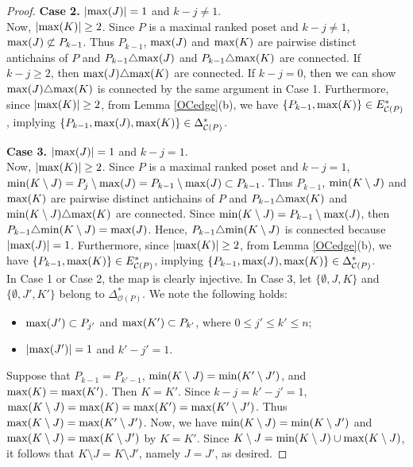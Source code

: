 \documentclass[12pt]{amsart}
\theoremstyle{definition}
\begin{document}
\begin{proof}
\medskip
\noindent
{\bf Case 2.} $|{\rm max}(J)| = 1$ and $k-j \neq 1$.\\
\indent
Now, $|{\rm max}(K)| \geq 2$.
Since $P$ is a maximal ranked poset and $k - j \neq 1$, ${\rm max}(J) \not\subset P_{k-1}$.
Thus $P_{k-1}$, ${\rm max}(J)$ and ${\rm max}(K)$ are pairwise distinct antichains of $P$ and $P_{k-1} \triangle {\rm max}(J)$ and $P_{k-1} \triangle {\rm max}(K)$ are connected.
If $k-j \geq 2$, then ${\rm max}(J) \triangle {\rm max}(K)$ are connected.
If $k-j = 0$, then we can show ${\rm max}(J) \triangle {\rm max}(K)$ is connected by the same argument in Case 1.
Furthermore, since $|{\rm max}(K)| \geq 2$, from Lemma \ref{OCedge}(b), we have $\{P_{k-1}, {\rm max}(K)\} \in E^{*}_{\mathcal{C}(P)}$, implying $\{P_{k-1},{\rm max}(J),{\rm max}(K)\} \in \Delta^{*}_{\mathcal{C}(P)}$. 


\medskip
\noindent
{\bf Case 3.} $|{\rm max}(J)| = 1$ and $k-j = 1$.\\
\indent
Now, $|{\rm max}(K)| \geq 2$.
Since $P$ is a maximal ranked poset and $k - j = 1$, ${\rm min}(K \setminus J) = P_j \setminus {\rm max}(J) = P_{k-1} \setminus {\rm max}(J) \subset P_{k-1}$.
Thus $P_{k-1}$, ${\rm min}(K \setminus J)$ and ${\rm max}(K)$ are pairwise distinct antichains of $P$ and $P_{k-1} \triangle {\rm max}(K)$ and ${\rm min}(K \setminus J)\triangle {\rm max}(K)$ are connected.
Since ${\rm min}(K \setminus J) = P_{k-1} \setminus {\rm max}(J)$, then $P_{k-1} \triangle {\rm min}(K \setminus J) = {\rm max}(J)$.
Hence, $P_{k-1} \triangle {\rm min}(K \setminus J)$ is connected because $|{\rm max}(J)|=1$.
Furthermore, since $|{\rm max}(K)| \geq 2$, from Lemma \ref{OCedge}(b), we have $\{P_{k-1}, {\rm max}(K)\} \in E^{*}_{\mathcal{C}(P)}$, implying $\{P_{k-1},{\rm max}(J),{\rm max}(K)\} \in \Delta^{*}_{\mathcal{C}(P)}$. 
\\

\medskip
In Case 1 or Case 2, the map is clearly injective.
In Case 3, let $\{\emptyset, J, K \}$ and $\{\emptyset, J', K' \}$ belong to $\Delta^{*}_{\mathcal{O}(P)}$.
We note the following holds:
\begin{itemize}
\item 
${\rm max}(J') \subset P_{j'}$ and ${\rm max}(K') \subset P_{k'}$, where $0 \leq j' \leq k' \leq n$;
\item
$|{\rm max}(J')|=1$ and $k'-j'=1$.
\end{itemize}
Suppose that $P_{k-1} = P_{k'-1}$, ${\rm min}(K \setminus J)={\rm min}(K' \setminus J')$, and ${\rm max}(K)={\rm max}(K')$.
Then $K=K'$.
Since $k - j = k' - j' = 1$, ${\rm max}(K \setminus J) = {\rm max}(K) = {\rm max}(K') = {\rm max}(K' \setminus J')$.
Thus ${\rm max}(K \setminus J) = {\rm max}(K' \setminus J')$.
Now, we have ${\rm min}(K \setminus J) = {\rm min}(K \setminus J')$ and ${\rm max}(K \setminus J) = {\rm max}(K \setminus J')$ by $K=K'$.
Since $K \setminus J = {\rm min}(K \setminus J) \cup {\rm max}(K \setminus J)$, it follows that $K \setminus J = K \setminus J'$, namely $J=J'$, as desired.
\end{proof}
\end{document}
